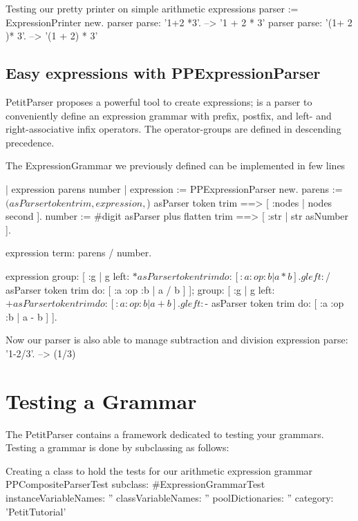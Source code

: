 \documentclass[a4paper,10pt,twoside]{book}
\begin{document}
\begin{script}{Testing our pretty printer on simple arithmetic expressions}
parser := ExpressionPrinter new.
parser parse: '1+2 *3'.          --> '1 + 2 * 3'
parser parse: '(1+ 2 )* 3'.      --> '(1 + 2) * 3'
\end{script}

\subsection{Easy expressions with PPExpressionParser}

PetitParser proposes a powerful tool to create expressions;
 is a parser to conveniently define an expression
grammar with prefix, postfix, and left- and right-associative infix
operators. The operator-groups are defined in descending precedence.

\begin{script}{The ExpressionGrammar we previously defined can be implemented in few lines}

| expression parens number |
expression := PPExpressionParser new.
parens := $( asParser token trim , expression , $) asParser token trim
==> [ :nodes | nodes second ].
number := #digit asParser plus flatten trim ==> [ :str | str asNumber ].

expression term: parens / number.

expression
  group: [ :g |
    g left: $* asParser token trim do: [ :a :op :b | a * b ].
    g left: $/ asParser token trim do: [ :a :op :b | a / b ] ];
  group: [ :g |
    g left: $+ asParser token trim do: [ :a :op :b | a + b ].
    g left: $- asParser token trim do: [ :a :op :b | a - b ] ].
\end{script}

\begin{script}{Now our parser is also able to manage subtraction and division}
expression parse: '1-2/3'.       --> (1/3)
\end{script}


\section{Testing a Grammar}

The PetitParser contains a framework dedicated to testing your
grammars. Testing a grammar is done by subclassing
 as follows:

\begin{script}{Creating a class to hold the tests for our arithmetic expression grammar}
PPCompositeParserTest subclass: #ExpressionGrammarTest
  instanceVariableNames: ''
  classVariableNames: ''
  poolDictionaries: ''
  category: 'PetitTutorial'
\end{script}
\end{document}
